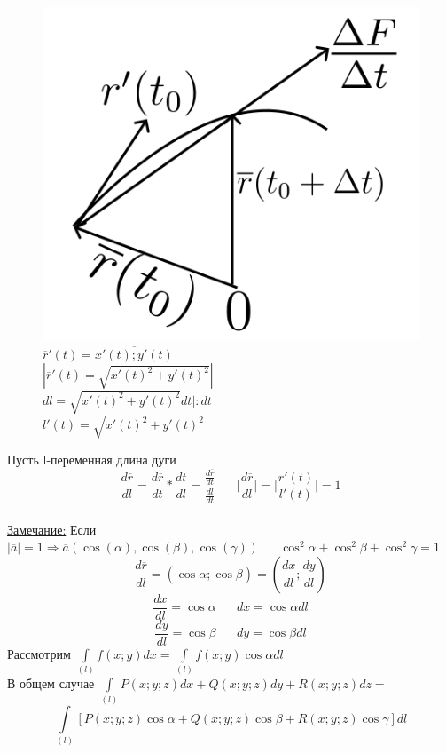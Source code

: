 \documentclass[12pt]{article}
\let\ORIincludegraphics\includegraphics
\renewcommand{\includegraphics}[2][]{\ORIincludegraphics[scale=0.65,#1]{#2}}
\let\oldint\int
\renewcommand{\int}{\oldint\limits}
\begin{document}
\begin{figure}[h!]
\begin{minipage}{0.45\textwidth}
        \includegraphics[width=\textwidth]{8.6.2.png} %
        \vspace{0.5em}
        $\overline{r}'(t)=\overline{x'(t);y'(t)}$\\
        $|\overline{r}'(t)=\sqrt{x'(t)^2+y'(t)^2}|$\\
        $dl=\sqrt{x'(t)^2+y'(t)^2}dt|:dt$\\
        $l'(t)=\sqrt{x'(t)^2+y'(t)^2}$
    \end{minipage}
  \end{figure}
  \par
  Пусть l-переменная длина дуги\\
  \[\frac{d \overline{r}}{dl} = \frac{d \overline{r}}{dt}* \frac{dt}{dl}=\frac{\frac{d \overline{r}}{dt}}{\frac{dl}{dt}}
  \hspace{20pt} \Big| \frac{d \overline{r}}{dl} \Big| = \Big| \frac{r'(t)}{l'(t)} \Big| = 1\]\\
  \underline{Замечание:} Если $|\overline{a}|=1 \Rightarrow \overline{a}(\cos(\alpha),\cos(\beta),\cos(\gamma))
  \hspace{20pt} \cos^2 \alpha+\cos^2 \beta+\cos^2 \gamma=1$\\
  \[\frac{d \overline{r}}{dl}=(\overline{\cos \alpha; \cos \beta})=(\overline{\frac{dx}{dl};\frac{dy}{dl}})\]
  \[\frac{dx}{dl}=\cos \alpha \hspace{20pt} dx=\cos \alpha dl\]
  \[\frac{dy}{dl}=\cos \beta \hspace{20pt} dy=\cos \beta dl\]
  Рассмотрим $\int_{(l)}f(x;y)dx=\int_{(l)}f(x;y)\cos \alpha dl$\\
  В общем случае $\int_{(l)}P(x;y;z)dx+Q(x;y;z)dy+R(x;y;z)dz=$\\
  \[\int_{(l)} [P(x;y;z)\cos \alpha + Q(x;y;z)\cos \beta + R(x;y;z)\cos \gamma]dl\]
\end{document}
